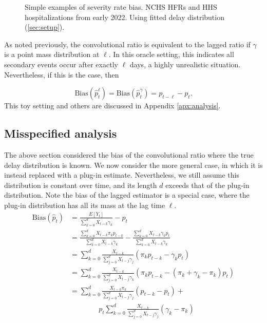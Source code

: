 \documentclass{article}
\begin{document}
\begin{figure}
\begin{subfigure}[b]{0.32\linewidth}
         \caption{}
         \label{fig:toy_primary}
     \end{subfigure}
        \caption{Simple examples of severity rate bias. NCHS HFRs and HHS hospitalizations from early 2022. Using fitted delay distribution (\ref{sec:setup}).}
        \label{fig:bias_ex_main}
\end{figure}


As noted previously, the convolutional ratio is equivalent to the lagged ratio if $\gamma$ is a point mass distribution at $\ell$. In this oracle setting, this indicates all secondary events occur after exactly $\ell$ days, a highly unrealistic situation. Nevertheless, if this is the case, then 

$$\text{Bias}(\hat{p}_t^\ell) = \text{Bias}(\hat{p}_t^\gamma) = p_{t-\ell}-p_t.$$
\noindent This toy setting and others are discussed in Appendix \ref{apx:analysis}.

\subsection{Misspecified analysis}

The above section considered the bias of the convolutional ratio where the true delay distribution is known. We now consider the more general case, in which it is instead replaced with a plug-in estimate. Nevertheless, we still assume this distribution is constant over time, and its length $d$ exceeds that of the plug-in distribution. Note the bias of the lagged estimator is a special case, where the plug-in distribution has all its mass at the lag time $\ell$. 
\begin{align}\label{eq:MispBias}
    \text{Bias}(\hat{p}_t) &= \frac{E[Y_t]}{\sum_{k=0}^d X_{t-k}\gamma_k} - p_t \nonumber\\
    &= \frac{\sum_{k=0}^d X_{t-k}\pi_k p_{t-k}}{\sum_{k=0}^d X_{t-k}\gamma_k} - \frac{\sum_{k=0}^d X_{t-k}\gamma_k p_t}{\sum_{k=0}^d X_{t-k}\gamma_k}\nonumber \\
    &= \sum_{k=0}^d \frac{X_{t-k}}{\sum_{j=0}^d X_{t-j}\gamma_j}(\pi_k p_{t-k}-\gamma_k p_t)\nonumber \\
    &= \sum_{k=0}^d \frac{X_{t-k}}{\sum_{j=0}^d X_{t-j}\gamma_k}(\pi_k p_{t-k}-(\pi_k +\gamma_k-\pi_k) p_t)\nonumber \\
     &= \sum_{k=0}^d \frac{X_{t-k}\pi_k}{\sum_{j=0}^d X_{t-j}\gamma_j}(p_{t-k}-p_t) +\nonumber\\
     &\qquad\qquad p_t\sum_{k=0}^d \frac{X_{t-k}}{\sum_{j=0}^d X_{t-j}\gamma_j}(\gamma_k -\pi_k) 
\end{align}
\end{document}
